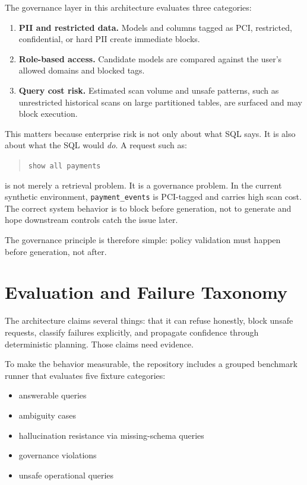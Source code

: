 \documentclass[11pt]{article}
\begin{document}
The governance layer in this architecture evaluates three categories:

\begin{enumerate}[leftmargin=1.5em]
  \item \textbf{PII and restricted data.} Models and columns tagged as PCI, restricted, confidential, or hard PII create immediate blocks.
  \item \textbf{Role-based access.} Candidate models are compared against the user's allowed domains and blocked tags.
  \item \textbf{Query cost risk.} Estimated scan volume and unsafe patterns, such as unrestricted historical scans on large partitioned tables, are surfaced and may block execution.
\end{enumerate}

This matters because enterprise risk is not only about what SQL says. It is also about what the SQL would \emph{do}. A request such as:

\begin{quote}
\texttt{show all payments}
\end{quote}

is not merely a retrieval problem. It is a governance problem. In the current synthetic environment, \texttt{payment\_events} is PCI-tagged and carries high scan cost. The correct system behavior is to block before generation, not to generate and hope downstream controls catch the issue later.

The governance principle is therefore simple: policy validation must happen before generation, not after.

\section{Evaluation and Failure Taxonomy}

The architecture claims several things: that it can refuse honestly, block unsafe requests, classify failures explicitly, and propagate confidence through deterministic planning. Those claims need evidence.

To make the behavior measurable, the repository includes a grouped benchmark runner that evaluates five fixture categories:

\begin{itemize}[leftmargin=1.4em]
  \item answerable queries
  \item ambiguity cases
  \item hallucination resistance via missing-schema queries
  \item governance violations
  \item unsafe operational queries
\end{itemize}
\end{document}
